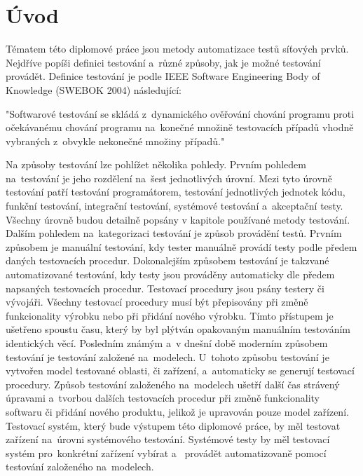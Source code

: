 \chapter{Úvod}
Tématem této diplomové práce jsou metody automatizace testů síťových prvků. Nejdříve popíši definici testování a~různé způsoby, jak je možné testování provádět. Definice testování je podle IEEE Software Engineering Body of Knowledge (SWEBOK 2004) následující:

"Softwarové testování se skládá z~dynamického ověřování chování programu proti očekávanému chování programu na~konečné množině testovacích případů vhodně vybraných z~obvykle nekonečné množiny případů." 

Na způsoby testování lze pohlížet několika pohledy. Prvním pohledem na~testování je jeho rozdělení na~šest jednotlivých úrovní. Mezi tyto úrovně testování patří testování programátorem, testování jednotlivých jednotek kódu, funkční testování, integrační testování, systémové testování a~akceptační testy. Všechny úrovně budou detailně popsány v kapitole používané metody testování. Dalším pohledem na~kategorizaci testování je způsob provádění testů. Prvním způsobem je manuální testování, kdy tester manuálně provádí testy podle předem daných testovacích procedur. Dokonalejším způsobem testování je takzvané automatizované testování, kdy testy jsou prováděny automaticky dle předem napsaných testovacích procedur. Testovací procedury jsou psány testery či vývojáři. Všechny testovací procedury musí být přepisovány při změně funkcionality výrobku nebo při přidání nového výrobku. Tímto přístupem je ušetřeno spoustu času, který by byl plýtván opakovaným manuálním testováním identických věcí. Posledním známým a~v dnešní době moderním způsobem testování je testování založené na~modelech. U~tohoto způsobu testování je vytvořen model testované oblasti, či zařízení, a~automaticky se generují testovací procedury. Způsob testování založeného na~modelech ušetří další čas strávený úpravami a~tvorbou dalších testovacích procedur při změně funkcionality softwaru či přidání nového produktu, jelikož je upravován pouze model zařízení. Testovací systém, který bude výstupem této diplomové práce, by měl testovat zařízení na~úrovni systémového testování. Systémové testy by měl testovací systém pro~konkrétní zařízení vybírat a~ provádět automatizovaně pomocí testování založeného na~modelech.

